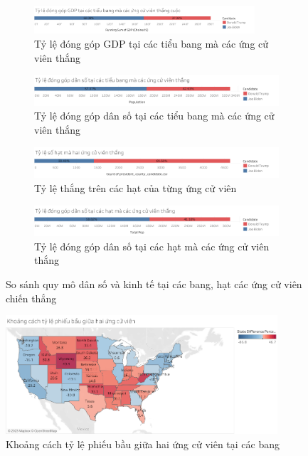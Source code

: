 \documentclass[14pt, a4paper]{article}
\numberwithin{equation}{section}
\numberwithin{figure}{section}
\numberwithin{dl}{section}
\numberwithin{md}{section}
\numberwithin{bd}{section}
\numberwithin{dn}{section}
\numberwithin{hq}{section}
\begin{document}
    \begin{figure}[h!]
        \centering
        \begin{subfigure}[b]{\textwidth}
            \includegraphics[width=0.9\textwidth]{State_Percentage_GDP_Candidate.png}
            \caption{Tỷ lệ đóng góp GDP tại các tiểu bang mà các ứng cử viên thắng}
        \end{subfigure}
        \vfill
        \begin{subfigure}[b]{\linewidth}
            \includegraphics[width=0.9\linewidth]{State_Percentage_Population_Candidate.png}
            \caption{Tỷ lệ đóng góp dân số tại các tiểu bang mà các ứng cử viên thắng}
        \end{subfigure}
        \vfill
        \begin{subfigure}[b]{\textwidth}
            \includegraphics[width=0.9\linewidth]{County_Total_Percentage_Candidate_Win.png}
            \caption{Tỷ lệ thắng trên các hạt của từng ứng cử viên}
        \end{subfigure}
        \vfill
        \begin{subfigure}[b]{\textwidth}
            \includegraphics[width=0.9\linewidth]{County_Percentage_Population_Candidate.png}
            \caption{Tỷ lệ đóng góp dân số tại các hạt mà các ứng cử viên thắng}
        \end{subfigure}
        \caption{So sánh quy mô dân số và kinh tế tại các bang, hạt các ứng cử viên chiến thắng}
    \end{figure}

    \begin{figure}[h!]
        \centering
        \includegraphics[width=0.9\textwidth]{figures/State_Difference_Percentage_Total_Vote_Two_Candidate.png}
        \caption{Khoảng cách tỷ lệ phiếu bầu giữa hai ứng cử viên tại các bang}
    \end{figure}
\end{document}
